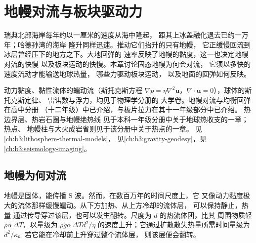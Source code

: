 \chapter{地幔对流与板块驱动力}\label{ch:b3:mantle-convection}

瑞典北部海岸每年约以一厘米的速度从海中隆起，
距其上冰盖融化退去已约一万年；哈德孙湾的海岸
隆升同样迅速。推动它们抬升的只有地幔，
它正缓慢回流到冰层曾经压下的地方之下。大地回弹的
速率反映了地幔的黏度，这一也决定地幔对流的快慢
以及板块运动的快慢。本章讨论固态地幔为何会对流，
它须以多快的速度流动才能输送地球热量，
哪些力驱动板块运动，
以及地面的回弹如何反映。

\begin{recall}
动力黏度、黏性流体的蠕动流（斯托克斯方程
$\nabla p = \eta\nabla^2\mathbf u$，$\nabla\cdot\mathbf u = 0$），球体的斯托克斯定律、
雷诺数与浮力，均见于物理学分册的
大学卷。地幔对流与均衡回弹在高中分册
（十二年级）中已介绍，与板片拉力在其十一年级部分中已介绍。
热边界层、热岩石圈与地幔绝热线
见于本科一年级分册中关于地球热收支的一章；热点、
地幔柱与大火成岩省则见于该分册中关于热点的一章。
见\cref{ch:b3:lithosphere-thermal-models}，
见\cref{ch:b3:gravity-geodesy}，见\cref{ch:b3:seismology-imaging}。
\end{recall}

\section{地幔为何对流}

地幔是固体，能传播 S 波。然而，在数百万年的时间尺度上，它
又像动力黏度极大的流体那样缓慢蠕动。从下方加热、从上方冷却的流体层，
可以保持静止，热量
通过传导穿过该层，也可以发生翻转。尺度为 $d$ 的热流体团，比其
周围物质轻 $\rho\alpha\,\Delta T$，以量级为
$\rho g\alpha\,\Delta T d^2/\eta$ 的速度上升；它通过扩散散失热量所需时间量级为
$d^2/\kappa$。若它能在冷却前上升穿过整个流体层，
则该层便会翻转。


